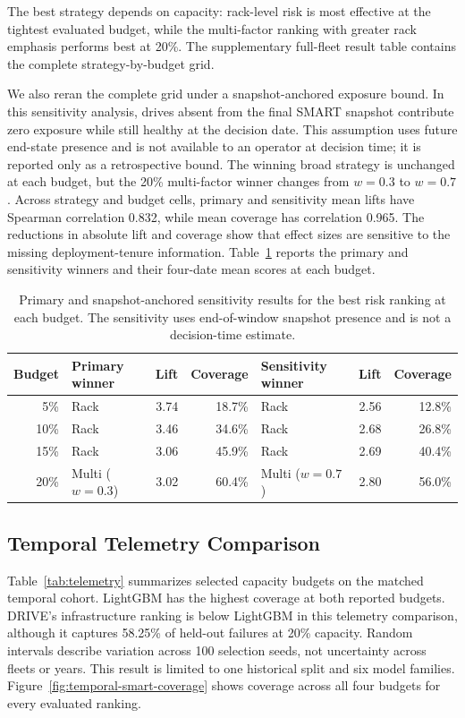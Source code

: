 \documentclass[conference]{IEEEtran}
\begin{document}
The best strategy depends on capacity: rack-level risk is most effective at the
tightest evaluated budget, while the multi-factor ranking with greater rack emphasis
performs best at 20\%. The supplementary full-fleet result table contains the complete
strategy-by-budget grid.

We also reran the complete grid under a snapshot-anchored exposure bound. In this
sensitivity analysis, drives absent from the final SMART snapshot contribute zero
exposure while still healthy at the decision date. This assumption uses future
end-state presence and is not available to an operator at decision time; it is reported
only as a retrospective bound. The winning broad strategy is unchanged at each budget,
but the 20\% multi-factor winner changes from $w=0.3$ to $w=0.7$. Across strategy and
budget cells, primary and sensitivity mean lifts have Spearman correlation 0.832, while
mean coverage has correlation 0.965. The reductions in absolute lift and coverage show
that effect sizes are sensitive to the missing deployment-tenure information.
Table~\ref{tab:exposure-sensitivity} reports the primary and sensitivity winners and
their four-date mean scores at each budget.

\begin{table}[t]
\caption{Primary and snapshot-anchored sensitivity results for the best risk ranking at each budget. The sensitivity uses end-of-window snapshot presence and is not a decision-time estimate.}
\label{tab:exposure-sensitivity}
\centering
\small
\begin{tabular}{rlrrlrr}
\toprule
Budget & Primary winner & Lift & Coverage & Sensitivity winner & Lift & Coverage \\
\midrule
5\%  & Rack & 3.74 & 18.7\% & Rack & 2.56 & 12.8\% \\
10\% & Rack & 3.46 & 34.6\% & Rack & 2.68 & 26.8\% \\
15\% & Rack & 3.06 & 45.9\% & Rack & 2.69 & 40.4\% \\
20\% & Multi ($w=0.3$) & 3.02 & 60.4\% & Multi ($w=0.7$) & 2.80 & 56.0\% \\
\bottomrule
\end{tabular}
\end{table}

\subsection{Temporal Telemetry Comparison}
Table~\ref{tab:telemetry} summarizes selected capacity budgets on the matched temporal
cohort. LightGBM has the highest coverage at both reported budgets. DRIVE's
infrastructure ranking is below LightGBM in this telemetry comparison, although it
captures 58.25\% of held-out failures at 20\% capacity. Random intervals describe
variation across 100 selection seeds, not uncertainty across fleets or years. This
result is limited to one historical split and six model families. Figure~\ref{fig:temporal-smart-coverage}
shows coverage across all four budgets for every evaluated ranking.
\end{document}
